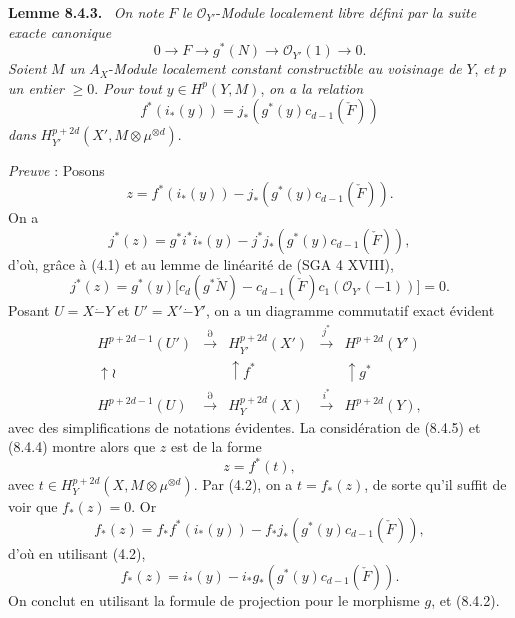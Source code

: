 \documentclass[11pt]{article}
\newenvironment{statement}[1]{\par\medskip\noindent\textbf{#1.}\ }{\par\medskip}
\begin{document}
\begin{statement}{Lemme 8.4.3}
\emph{On note} $F$ \emph{le} $\mathcal O_{Y'}$-\emph{Module localement libre défini par la suite exacte canonique}
\[
0\to F\to g^*(N)\to\mathcal O_{Y'}(1)\to0.
\]
\emph{Soient} $M$ \emph{un} $A_X$-\emph{Module localement constant constructible au voisinage de} $Y$, \emph{et} $p$ \emph{un entier} $\ge0$. \emph{Pour tout} $y\in H^p(Y,M)$, \emph{on a la relation}
\[
f^*(i_*(y))=j_*(g^*(y)c_{d-1}(\check F))
\]
\emph{dans} $H_{Y'}^{p+2d}(X',M\otimes\mu^{\otimes d})$.
\end{statement}

\emph{Preuve} : Posons
\[
z=f^*(i_*(y))-j_*(g^*(y)c_{d-1}(\check F)).
\]
On a
\[
j^*(z)=g^*i^*i_*(y)-j^*j_*(g^*(y)c_{d-1}(\check F)),
\]
d'où, grâce à (4.1) et au lemme de linéarité de (SGA 4 XVIII),
\[
j^*(z)=g^*(y)\bigl[c_d(g^*\check N)-c_{d-1}(\check F)c_1(\mathcal O_{Y'}(-1))\bigr]=0.
\tag{8.4.4}
\]
Posant $U=X\mathbin{\dot{-}}Y$ et $U'=X'\mathbin{\dot{-}}Y'$, on a un diagramme commutatif exact évident
\[
\begin{array}{ccccc}
H^{p+2d-1}(U')&\xrightarrow{\partial}&H^{p+2d}_{Y'}(X')&\xrightarrow{j^*}&H^{p+2d}(Y')\\
\uparrow\wr&&\uparrow f^*&&\uparrow g^*\\
H^{p+2d-1}(U)&\xrightarrow{\partial}&H_Y^{p+2d}(X)&\xrightarrow{i^*}&H^{p+2d}(Y),
\end{array}
\tag{8.4.5}
\]
avec des simplifications de notations évidentes. La considération de (8.4.5) et (8.4.4) montre alors que $z$ est de la forme
\[
z=f^*(t),
\]
avec $t\in H_Y^{p+2d}(X,M\otimes\mu^{\otimes d})$. Par (4.2), on a $t=f_*(z)$, de sorte qu'il suffit de voir que $f_*(z)=0$. Or
\[
f_*(z)=f_*f^*(i_*(y))-f_*j_*(g^*(y)c_{d-1}(\check F)),
\]
d'où en utilisant (4.2),
\[
f_*(z)=i_*(y)-i_*g_*(g^*(y)c_{d-1}(\check F)).
\]
On conclut en utilisant la formule de projection pour le morphisme $g$, et (8.4.2).
\end{document}
